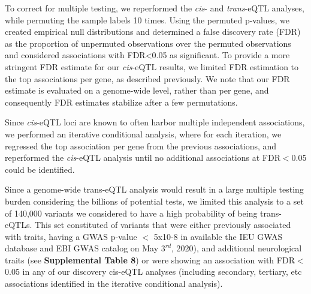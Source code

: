 {{To correct for multiple testing, we reperformed the \emph{cis}- and \emph{trans}-eQTL analyses, while permuting the sample labels 10 times. Using the permuted p-values, we created empirical null distributions and determined a false discovery rate (FDR) as the proportion of unpermuted observations over the permuted observations and considered associations with FDR<0.05 as significant. To provide a more stringent FDR estimate for our \emph{cis}-eQTL results, we limited FDR estimation to the top associations per gene, as described previously\cite{vosaUnravelingPolygenicArchitecture2018}. We note that our FDR estimate is evaluated on a genome-wide level, rather than per gene, and consequently FDR estimates stabilize after a few permutations\cite{westraSystematicIdentificationTrans2013}. 

Since \emph{cis}-eQTL loci are known to often harbor multiple independent associations, we performed an iterative conditional analysis, where for each iteration, we regressed the top association per gene from the previous associations, and reperformed the \emph{cis}-eQTL analysis until no additional associations at FDR$<$0.05 could be identified. 

Since a genome-wide trans-eQTL analysis would result in a large multiple testing burden considering the billions of potential tests, we limited this analysis to a set of 140,000 variants we considered to have a high probability of being trans-eQTLs. This set constituted of variants that were either previously associated with traits, having a GWAS p-value $<$ 5x10-8 in available the IEU GWAS database\cite{lyonVariantCallFormat2020} and EBI GWAS catalog\cite{bunielloNHGRIEBIGWASCatalog2019} on May $3^{rd}$, 2020), and additional neurological traits (see \textbf{Supplemental Table 8}) or were showing an association with FDR$<$0.05 in any of our discovery cis-eQTL analyses (including secondary, tertiary, etc associations identified in the iterative conditional analysis). 

}}
